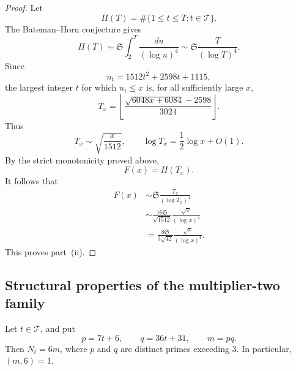 \documentclass[11pt,reqno]{amsart}
\numberwithin{equation}{section}
\theoremstyle{plain}
\theoremstyle{definition}
\theoremstyle{remark}
\begin{document}
\begin{proof}
Let
\[
\Pi(T)=\#\{1\le t\le T:t\in\mathcal T\}.
\]
The Bateman--Horn conjecture gives
\[
\Pi(T)
\sim
\mathfrak S\int_2^T\frac{du}{(\log u)^4}
\sim
\mathfrak S\frac{T}{(\log T)^4}.
\]
Since
\[
n_t=1512t^2+2598t+1115,
\]
the largest integer $t$ for which $n_t\le x$ is, for all sufficiently large $x$,
\[
T_x
=
\left\lfloor
\frac{\sqrt{6048x+6084}-2598}{3024}
\right\rfloor.
\]
Thus
\[
T_x\sim\sqrt{\frac{x}{1512}},
\qquad
\log T_x=\frac12\log x+O(1).
\]
By the strict monotonicity proved above,
\[
F(x)=\Pi(T_x).
\]
It follows that
\[
\begin{aligned}
F(x)
&\sim\mathfrak S\frac{T_x}{(\log T_x)^4}\\
&\sim\frac{16\mathfrak S}{\sqrt{1512}}\frac{\sqrt{x}}{(\log x)^4}\\
&=\frac{8\mathfrak S}{3\sqrt{42}}\frac{\sqrt{x}}{(\log x)^4}.
\end{aligned}
\]
This proves part~(ii).
\end{proof}

\subsection{Structural properties of the multiplier-two family}

Let $t\in\mathcal T$, and put
\[
p=7t+6,\qquad q=36t+31,\qquad m=pq.
\]
Then $N_t=6m$, where $p$ and $q$ are distinct primes exceeding $3$. In particular, $(m,6)=1$.
\end{document}
